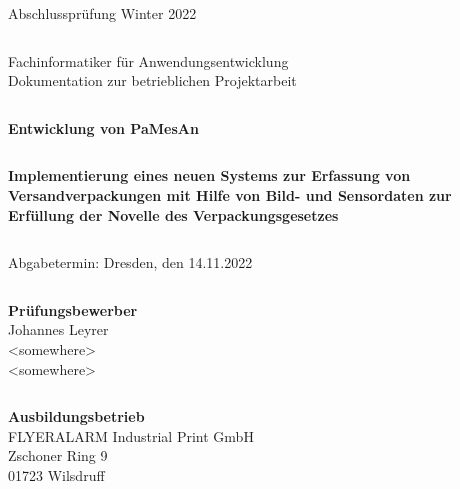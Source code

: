 \documentclass[
  a4paper,
  11pt,
  headings=small,
  ngerman,
  listof=totoc,
  numbers=noenddot,
  parskip=half,
  toc=flat
  ]{scrartcl}[2021/11/13]
\begin{document}
\pagestyle{empty}


\begin{center}
  {\Large Abschlussprüfung Winter 2022}
\end{center}
\begin{verbatim}

\end{verbatim}
\begin{center}
  {\Large Fachinformatiker für Anwendungsentwicklung} \\
  \vspace{0.3cm}
  {\LARGE Dokumentation zur betrieblichen Projektarbeit}
\end{center}
\begin{verbatim}

\end{verbatim}
\begin{center}
  {\huge \textbf{Entwicklung von PaMesAn}}
\end{center}
\begin{verbatim}

\end{verbatim}
\begin{center}
  {\Large \textbf{Implementierung eines neuen Systems zur Erfassung von Versandverpackungen mit Hilfe von Bild- und Sensordaten zur Erfüllung der Novelle des Verpackungsgesetzes}}
\end{center}
\begin{verbatim}

\end{verbatim}

\begin{center}
  {\large Abgabetermin: Dresden, den 14.11.2022}
\end{center}
\begin{verbatim}

\end{verbatim}

\begin{center}
  \textbf{\large{Prüfungsbewerber}} \\
  {\large Johannes Leyrer} \\
  {\large <somewhere>} \\
  {\large <somewhere>}
\end{center}
\begin{verbatim}

\end{verbatim}

\begin{center}
  \textbf{\large{Ausbildungsbetrieb}} \\
  {\large FLYERALARM Industrial Print GmbH} \\
  {\large Zschoner Ring 9} \\
  {\large 01723 Wilsdruff}
\end{center}
\begin{verbatim}

\end{verbatim}
\end{document}
